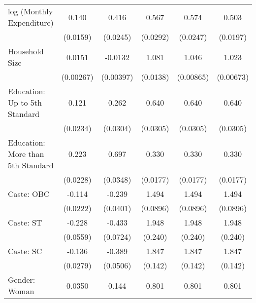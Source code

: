 {\begin{tabular}{l*{5}{c}}
\hline
log (Monthly Expenditure)&       0.140\sym{***}&       0.416\sym{***}&       0.567\sym{***}&       0.574\sym{***}&       0.503\sym{***}\\
                    &    (0.0159)         &    (0.0245)         &    (0.0292)         &    (0.0247)         &    (0.0197)         \\
[1em]
Household Size       &      0.0151\sym{***}&     -0.0132\sym{***}&       1.081\sym{***}&       1.046\sym{***}&       1.023\sym{***}\\
                    &   (0.00267)         &   (0.00397)         &    (0.0138)         &   (0.00865)         &   (0.00673)         \\
[1em]
Education: Up to 5th Standard          &       0.121\sym{***}&       0.262\sym{***}&       0.640\sym{***}&       0.640\sym{***}&       0.640\sym{***}\\
                    &    (0.0234)         &    (0.0304)        &    (0.0305)         &    (0.0305)         &    (0.0305)         \\
[1em]                    
Education: More than 5th Standard        &       0.223\sym{***}&       0.697\sym{***}&       0.330\sym{***}&       0.330\sym{***}&       0.330\sym{***}\\
                    &    (0.0228)         &    (0.0348)         &    (0.0177)         &    (0.0177)         &    (0.0177)         \\
[1em]
Caste: OBC             &      -0.114\sym{***}&      -0.239\sym{***}&       1.494\sym{***}&       1.494\sym{***}&       1.494\sym{***}\\
                    &    (0.0222)         &    (0.0401)         &    (0.0896)         &    (0.0896)         &    (0.0896)         \\
[1em]
Caste: ST            &      -0.228\sym{***}&      -0.433\sym{***} &       1.948\sym{***}&       1.948\sym{***}&       1.948\sym{***}\\
                    &    (0.0559)         &    (0.0724)         &     (0.240)         &     (0.240)         &     (0.240)         \\
Caste: SC            &      -0.136\sym{***}&      -0.389\sym{***}&       1.847\sym{***}&       1.847\sym{***}&       1.847\sym{***}\\
                    &    (0.0279)         &    (0.0506)         &     (0.142)         &     (0.142)         &     (0.142)         \\
[1em]
Gender: Woman   &      0.0350         &       0.144\sym{**} &       0.801\sym{**} &       0.801\sym{**} &       0.801\sym{**} \\

\end{tabular}}
